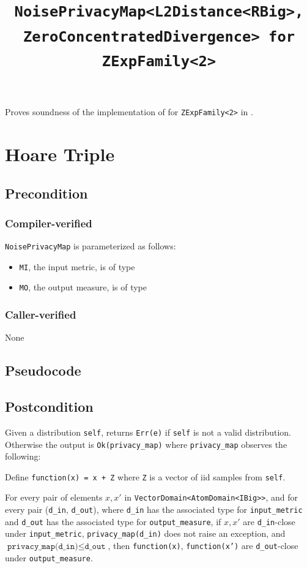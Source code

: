 \documentclass{article}
\title{\texttt{NoisePrivacyMap<L2Distance<RBig>, ZeroConcentratedDivergence> for ZExpFamily<2>}}
\author{\MichaelShoemateAuthor}
\date{}
\begin{document}
\maketitle

\contrib
Proves soundness of the implementation of  for \texttt{ZExpFamily<2>} in .

\section{Hoare Triple}
\subsection*{Precondition}
\subsubsection*{Compiler-verified}
\texttt{NoisePrivacyMap} is parameterized as follows:
\begin{itemize}
    \item \texttt{MI}, the input metric, is of type 
    \item \texttt{MO}, the output measure, is of type 
\end{itemize}

\subsubsection*{Caller-verified}
None

\subsection*{Pseudocode}


\subsection*{Postcondition}
\begin{theorem}
    Given a distribution \texttt{self},
    returns \texttt{Err(e)} if \texttt{self} is not a valid distribution.
    Otherwise the output is \texttt{Ok(privacy\_map)}
    where \texttt{privacy\_map} observes the following:

    Define \texttt{function(x) = x + Z} where \texttt{Z} is a vector of iid samples from \texttt{self}.

    For every pair of elements $x, x'$ in \texttt{VectorDomain<AtomDomain<IBig>{}>},
    and for every pair (\texttt{d\_in}, \texttt{d\_out}),
    where \texttt{d\_in} has the associated type for \texttt{input\_metric} and \texttt{d\_out} has the associated type for \texttt{output\_measure},
    if $x, x'$ are \texttt{d\_in}-close under \texttt{input\_metric}, \texttt{privacy\_map(d\_in)} does not raise an exception,
    and $\texttt{privacy\_map(d\_in)} \leq \texttt{d\_out}$,
    then \texttt{function(x)}, \texttt{function(x')} are \texttt{d\_out}-close under \texttt{output\_measure}.
\end{theorem}
\end{document}
